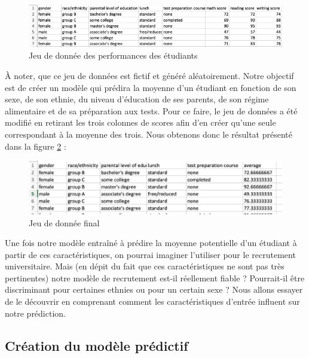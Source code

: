 \begin{figure}[h]
    \includegraphics[scale=0.65]{src_img/studentsPerformanceDataSet.png}
    \caption{Jeu de donnée des performances des étudiants}
    \label{studentsPerformanceDataSet}
\end{figure}

À noter, que ce jeu de données est fictif et généré aléatoirement. Notre objectif est de créer un modèle qui prédira la moyenne d’un étudiant en fonction de son sexe, de son ethnie, du niveau d’éducation de ses parents, de son régime alimentaire et de sa préparation aux tests. Pour ce faire, le jeu de données a été modifié en retirant les trois colonnes de scores afin d'en créer qu'une seule correspondant à la moyenne des trois. Nous obtenons donc le résultat présenté dans la figure \ref{studentsPerformanceDataSetModif} : 
\begin{figure}[h]
    \includegraphics[scale=1]{src_img/StudentsPerformanceDataSetModif.png}
    \caption{Jeu de donnée final}
    \label{studentsPerformanceDataSetModif}
\end{figure}

Une fois notre modèle entraîné à prédire la moyenne potentielle d'un étudiant à partir de ces caractéristiques, on pourrai imaginer l'utiliser pour le recrutement universitaire. Mais (en dépit du fait que ces caractéristiques ne sont pas très pertinentes) notre modèle de recrutement est-il réellement fiable ? Pourrait-il être discriminant pour certaines ethnies ou pour un certain sexe ? Nous allons essayer de le découvrir en comprenant comment les caractéristiques d'entrée influent sur notre prédiction.

\subsection{Création du modèle prédictif}
